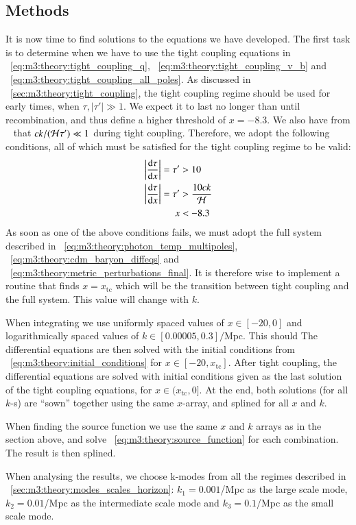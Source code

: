 \subsection{Methods}\label{sec:m3:methods}

    It is now time to find solutions to the equations we have developed. The first task is to determine when we have to use the tight coupling equations in ~\cref{eq:m3:theory:tight_coupling_q}, ~\cref{eq:m3:theory:tight_coupling_v_b} and ~\cref{eq:m3:theory:tight_coupling_all_poles}. As discussed in ~\cref{sec:m3:theory:tight_coupling}, the tight coupling regime should be used for early times, when $\tau, |\tau'| \gg1$. We expect it to last no longer than until recombination, and thus define a higher threshold of $x=-8.3$. We also have from ~\cite{https://doi.org/10.48550/arxiv.astro-ph/0606683} that $ck/(\mathcal{H}\tau')\ll1$ during tight coupling. Therefore, we adopt the following conditions, all of which must be satisfied for the tight coupling regime to be valid:
    \begin{equation}
        \begin{split}
            \abs{\dv{\tau}{x}} = \tau' &> 10 \\
            \abs{\dv{\tau}{x}} = \tau' &> \frac{10ck}{\mathcal{H}} \\
            x &< -8.3
        \end{split}
    \end{equation}
    As soon as one of the above conditions fails, we must adopt the full system described in ~\cref{eq:m3:theory:photon_temp_multipoles}, ~\cref{eq:m3:theory:cdm_baryon_diffeqs} and ~\cref{eq:m3:theory:metric_perturbations_final}. It is therefore wise to implement a routine that finds $x=x_\mathrm{tc}$ which will be the transition between tight coupling and the full system. This value will change with $k$. 

    When integrating we use uniformly spaced values of $x\in[-20,0]$ and logarithmically spaced values of $k\in[0.00005, 0.3]/\mathrm{Mpc}$. This should The differential equations are then solved with the initial conditions from ~\cref{eq:m3:theory:initial_conditions} for $x\in[-20,x_\mathrm{tc}]$. After tight coupling, the differential equations are solved with initial conditions given as the last solution of the tight coupling equations, for $x\in(x_\mathrm{tc},0]$. At the end, both solutions (for all $k$-s) are ``sown'' together using the same $x$-array, and splined for all $x$ and $k$. 

    When finding the source function we use the same $x$ and $k$ arrays as in the section above, and solve ~\cref{eq:m3:theory:source_function} for each combination. The result is then splined. 

    When analysing the results, we choose k-modes from all the regimes described in ~\cref{sec:m3:theory:modes_scales_horizon}: $k_1=0.001$/Mpc as the large scale mode, $k_2=0.01$/Mpc as the intermediate scale mode and $k_3=0.1$/Mpc as the small scale mode. 
